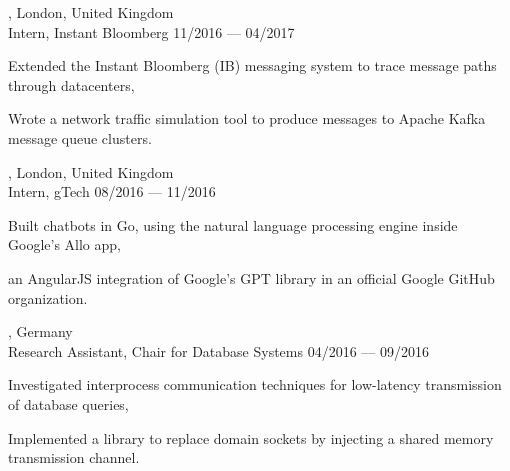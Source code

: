 \begin{entry}
	{, London, United Kingdom}
	{\\Intern, Instant Bloomberg}
	{11/2016 --- 04/2017}
  \item Extended the Instant Bloomberg (IB) messaging system to trace message paths through datacenters,
  \item Wrote a network traffic simulation tool to produce messages to Apache Kafka message queue clusters.
\end{entry}

\begin{entry}
  {, London, United Kingdom}
	{\\Intern, gTech}
	{08/2016 --- 11/2016}
  \item Built chatbots in Go, using the natural language processing engine inside Google's Allo app,
  \item {} an AngularJS integration of Google’s GPT library in an official Google GitHub organization.
\end{entry}

\begin{entry}
  {, Germany}
	{\\Research Assistant, Chair for Database Systems}
	{04/2016 --- 09/2016}

  \item Investigated interprocess communication techniques for low-latency transmission of database queries,
  \item Implemented a library to replace domain sockets by injecting a shared memory transmission channel.
\end{entry}

%
\vspace{-1mm}

